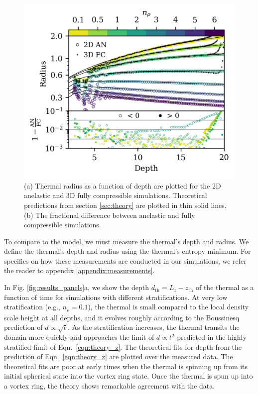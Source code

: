\documentclass[twocolumn, amsmath, amsfonts, amssymb, trackchanges]{aastex62}
\begin{document}
\begin{figure}[t!]
    \includegraphics[width=\columnwidth]{diff_AN_FC.png}
    \caption{
	(a) Thermal radius as a function of depth are plotted for the 2D anelastic and 3D fully compressible simulations.
	Theoretical predictions from section \ref{sec:theory} are plotted in thin solid lines.
	(b) The fractional difference between anelastic and fully compressible simulations.
    \label{fig:diff} }
\end{figure}

To compare to the model, we must measure the thermal's depth and radius.
We define the thermal's depth and radius using the thermal's entropy minimum.
For specifics on how these measurements are conducted in our simulations, we refer the reader to appendix \ref{appendix:measurements}.

In Fig. \ref{fig:results_panels}a, we show the depth $d_{\text{th}} = L_z - z_{\text{th}}$ of the thermal as a function of time for simulations with different stratifications. 
At very low stratification (e.g., $n_\rho = 0.1$), the thermal is small compared to the local density scale height at all depths, and it evolves roughly according to the Boussinesq prediction of $d \propto \sqrt{t}$. 
As the stratification increases, the thermal transits the domain more quickly and approaches the limit of $d \propto t^2$ predicted in the highly stratified limit of Eqn.~\ref{eqn:theory_z}. 
The theoretical fits for depth from the prediction of Eqn.~\ref{eqn:theory_z} are plotted over the measured data.
The theoretical fits are poor at early times when the thermal is spinning up from its initial spherical state into the vortex ring state.
Once the thermal is spun up into a vortex ring, the theory shows remarkable agreement with the data.
\end{document}
